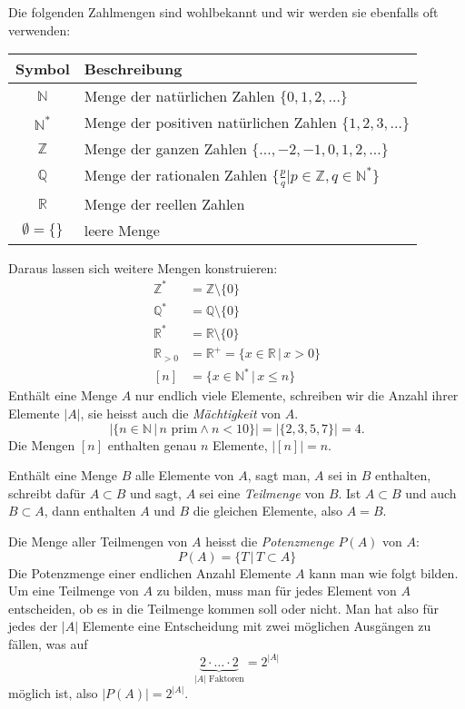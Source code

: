 Die folgenden Zahlmengen sind wohlbekannt und wir werden sie ebenfalls
oft verwenden:
\begin{center}
\begin{tabular}{|c|l|}
\hline
Symbol&Beschreibung\\
\hline
\index{natürliche Zahlen}%
$\mathbb N$&Menge der natürlichen Zahlen $\{0,1,2,\dots\}$\\
$\mathbb N^*$&Menge der positiven natürlichen Zahlen $\{1,2,3,\dots\}$\\
\index{ganze Zahlen}%
$\mathbb Z$&Menge der ganzen Zahlen $\{\dots,-2,-1,0,1,2,\dots\}$\\
\index{rationale Zahlen}%
$\mathbb Q$&Menge der rationalen Zahlen $\{\frac{p}{q}|p\in\mathbb Z,q\in\mathbb N^*\}$\\
\index{reelle Zahlen}%
$\mathbb R$&Menge der reellen Zahlen\\
\index{leere Menge}%
$\emptyset=\{\}$&leere Menge\\
\hline
\end{tabular}
\end{center}
Daraus lassen sich weitere Mengen konstruieren:
\begin{align*}
\mathbb Z^*&=\mathbb Z\setminus \{0\}\\
\mathbb Q^*&=\mathbb Q\setminus \{0\}\\
\mathbb R^*&=\mathbb R\setminus \{0\}\\
\mathbb R_{> 0}&=\mathbb R^+=\{x\in\mathbb R\,|\,x>0\}\\
[n]&=\{x\in \mathbb N^*\,|\,x\le n\}
\end{align*}
%
Enthält eine Menge $A$ nur endlich viele Elemente, schreiben wir die Anzahl
ihrer Elemente $|A|$, sie heisst auch die {\em Mächtigkeit} von $A$.
\[
|\{n\in\mathbb N\,|\,\text{$n$ prim}\wedge n<10\}|=|\{2,3,5,7\}|=4.
\]
Die Mengen $[n]$ enthalten genau $n$ Elemente, $|[n]|=n$.

Enthält eine Menge $B$ alle Elemente von $A$, sagt man, $A$ sei in $B$
enthalten, schreibt dafür $A\subset B$ und sagt, $A$ sei eine
{\em Teilmenge} von $B$.
Ist $A\subset B$ und auch
$B\subset A$, dann enthalten $A$ und $B$ die gleichen Elemente, also
$A=B$.

%
Die Menge aller Teilmengen von $A$ heisst die {\em Potenzmenge} $P(A)$ von $A$:
\[
P(A)=\{ T\,|\,T\subset A\}
\]
Die Potenzmenge einer endlichen Anzahl Elemente $A$ kann man wie folgt bilden.
Um eine Teilmenge von $A$ zu bilden, muss man für jedes Element
von $A$ entscheiden, ob es in die Teilmenge kommen soll oder nicht.
Man hat also für jedes der $|A|$ Elemente eine Entscheidung mit zwei
möglichen Ausgängen zu fällen, was auf
\[
\underbrace{2\cdot\dots\cdot 2}_{\text{$|A|$ Faktoren}}=2^{|A|}
\]
möglich ist, also $|P(A)|=2^{|A|}$.

